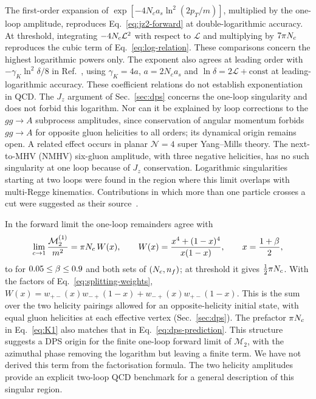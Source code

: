 The first-order expansion of $\exp[-4N_ca_s\ln^2(2p_T/m)]$, multiplied by the one-loop amplitude, reproduces Eq.~\eqref{eq:jz2-forward} at double-logarithmic accuracy.
At threshold, integrating $-4N_c\mathcal L^2$ with respect to $\mathcal L$ and multiplying by $7\pi N_c$ reproduces the cubic term of Eq.~\eqref{eq:log-relation}.
These comparisons concern the highest logarithmic powers only.
The exponent also agrees at leading order with $-\gamma_K\ln^2\delta/8$ in Ref.~\cite{DixonEsterlis2016,DixonEsterlis2016Erratum}, using $\gamma_K=4a$, $a=2N_ca_s$ and $\ln\delta=2\mathcal{L}+\mathrm{const}$ at leading-logarithmic accuracy.
These coefficient relations do not establish exponentiation in QCD.
%
%
%
%
The $J_z$ argument of
Sec.~\ref{sec:dps} concerns the one-loop singularity and does not forbid
this logarithm. Nor can it be explained by loop corrections to the $gg\to A$ subprocess amplitudes, since conservation of angular momentum forbids $gg\to A$ for opposite gluon helicities to all orders; its dynamical origin remains open. A related
effect occurs in planar $\mathcal N=4$ super Yang--Mills theory.
The next-to-MHV (NMHV) six-gluon amplitude, with three negative helicities, has no such singularity at one loop because of \(J_z\) conservation. Logarithmic singularities starting at two loops were found in the region where this limit overlaps with multi-Regge kinematics. Contributions in which more than one particle crosses a cut were suggested as their source~\cite{DixonEsterlis2016,DixonEsterlis2016Erratum}.

In the forward limit the one-loop remainders agree with
\begin{equation}
 \lim_{c\to1}\frac{\mathcal M_2^{(1)}}{m^2}=\pi N_c\,W(x),\qquad
 W(x)=\frac{x^4+(1-x)^4}{x(1-x)},\qquad x=\frac{1+\beta}{2},
 \label{eq:K1}
\end{equation}
to \KOneClosedDev{} for $0.05\leq\beta\leq0.9$ and both sets of $(N_c,n_f)$; at threshold it gives $\tfrac{1}{2}\pi N_c$.
With the factors of Eq.~\eqref{eq:splitting-weights},
$W(x)=w_{+-}(x)w_{-+}(1-x)+w_{-+}(x)w_{+-}(1-x)$.
This is the sum over the two helicity pairings allowed for an
opposite-helicity initial state, with equal gluon helicities at each
effective vertex (Sec.~\ref{sec:dps}).
The prefactor $\pi N_c$ in Eq.~\eqref{eq:K1} also matches that in
Eq.~\eqref{eq:dps-prediction}.
This structure suggests a DPS origin for the finite one-loop forward
limit of $\mathcal M_2$, with the azimuthal phase removing the
logarithm but leaving a finite term.
We have not derived this term from the factorisation formula.
The two helicity amplitudes provide an explicit two-loop QCD
benchmark for a general description of this singular region.



